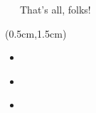\documentclass[xetex,18pt,aspectratio=43]{beamer}
\begin{document}
\begin{Large}
\begin{frame}{\ \ \ That's all, folks!}
\begin{textblock*}{\framewidth-0.8cm}(0.5cm,1.5cm)
\begin{itemize}
  \item \href{mailto:alexclear@gmail.com}{\color{blue}{alexclear@gmail.com}}
  \item \href{https://telegram.me/lhommequipleure}{\color{blue}{https://telegram.me/lhommequipleure}}
  \item \href{https://telegram.me/demeliorator\_pod}{\color{blue}{https://telegram.me/demeliorator\_pod}}
\end{itemize}
\end{textblock*}
\end{frame}

\end{Large}
\end{document}
